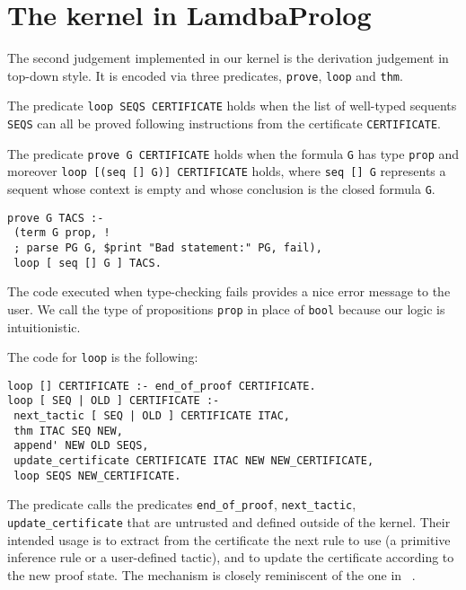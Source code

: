 \documentclass[preprint]{sigplanconf}
\begin{document}
% 
% 

\section{The kernel in LamdbaProlog}
The second judgement implemented in our kernel is the derivation judgement in top-down style. It is encoded via three predicates, \verb+prove+, \verb+loop+ and \verb+thm+.

The predicate \verb+loop SEQS CERTIFICATE+ holds when the list of well-typed sequents \verb+SEQS+ can all be proved following instructions from the certificate \verb+CERTIFICATE+.

The predicate \verb+prove G CERTIFICATE+ holds when the formula \verb+G+ has type \verb+prop+ and moreover \verb+loop [(seq [] G)] CERTIFICATE+ holds, where \verb+seq [] G+ represents a sequent whose context is empty and whose conclusion is the closed formula \verb+G+.
\begin{small}
\begin{verbatim}
prove G TACS :-
 (term G prop, !
 ; parse PG G, $print "Bad statement:" PG, fail),
 loop [ seq [] G ] TACS.
\end{verbatim}
\end{small}
The code executed when type-checking fails provides a nice error message to the user. We call the type of propositions \verb+prop+ in place of \verb+bool+ because our logic is intuitionistic.

The code for \verb+loop+ is the following:
\begin{small}
\begin{verbatim}
loop [] CERTIFICATE :- end_of_proof CERTIFICATE.
loop [ SEQ | OLD ] CERTIFICATE :-
 next_tactic [ SEQ | OLD ] CERTIFICATE ITAC,
 thm ITAC SEQ NEW,
 append' NEW OLD SEQS,
 update_certificate CERTIFICATE ITAC NEW NEW_CERTIFICATE,
 loop SEQS NEW_CERTIFICATE.
\end{verbatim}
\end{small}
The predicate calls the predicates \verb+end_of_proof+, \verb+next_tactic+, \verb+update_certificate+ that are untrusted and defined outside of the kernel. Their intended usage is to extract from the certificate the next rule to use (a primitive inference rule or a user-defined tactic), and to update the certificate according to the new proof state. The mechanism is closely reminiscent of the one in ~\cite{zak2}.
\end{document}

